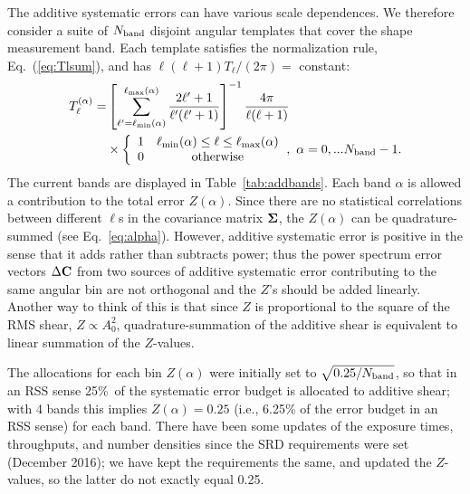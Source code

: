 \documentclass[usenatbib]{mnras}
\begin{document}
The additive systematic errors can have various scale dependences. We
therefore consider a suite of $N_{\rm band}$ disjoint angular
templates that cover the shape measurement band. Each template
satisfies the normalization rule, Eq.~(\ref{eq:Tlsum}), and has
$\ell(\ell+1)T_\ell/(2\pi)=$ constant:
\begin{align}
T_\ell^{(\alpha)} = &\left[ \sum_{\ell'=\ell_{\rm min}(\alpha)}^{\ell_{\rm max}(\alpha)} \frac{2\ell'+1}{\ell'(\ell'+1)} \right]^{-1} \frac{4\pi}{\ell(\ell+1)}\nonumber\\
&\times\left\{ \begin{array}{cc} 1 & \ell_{\rm min}(\alpha)\le\ell\le\ell_{\rm max}(\alpha) \\ 0 & {\rm otherwise} \end{array} \right.\!,~\alpha=0,...N_{\rm band}-1.
\end{align}
The current bands are displayed in Table~\ref{tab:addbands}. Each band
$\alpha$ is allowed a contribution to the total error
$Z(\alpha)$. Since there are no statistical correlations between
different $\ell$s in the covariance matrix ${\bf\Sigma}$, the
$Z(\alpha)$ can be quadrature-summed (see
Eq.~\ref{eq:alpha}). However, additive systematic error is positive in
the sense that it adds rather than subtracts power; thus the power
spectrum error vectors $\Delta{\bf C}$ from two sources of additive
systematic error contributing to the same angular bin are not
orthogonal and the $Z$'s should be added linearly. Another way to
think of this is that since $Z$ is proportional to the square of the
RMS shear, $Z\propto A_0^2$, quadrature-summation of the additive
shear is equivalent to linear summation of the $Z$-values.

The allocations for each bin $Z(\alpha)$ were initially set to $\sqrt{0.25/N_{\rm band}}$, so that in an RSS sense 25\%\ of the systematic error budget is allocated to additive shear; with 4 bands this implies $Z(\alpha)=0.25$ (i.e., 6.25\% of the error budget in an RSS sense) for each band. There have been some updates of the exposure times, throughputs, and number densities since the SRD requirements were set (December 2016); we have kept the requirements the same, and updated the $Z$-values, so the latter do not exactly equal 0.25.
\end{document}
